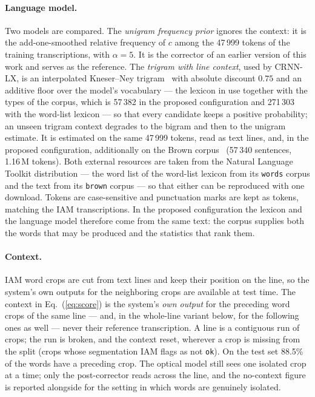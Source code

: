 \documentclass{ws-ijprai}
\newcommand{\ours}{CRNN-LX}            %
\begin{document}
\paragraph{Language model.}
Two models are compared. The \emph{unigram frequency prior} ignores the
context: it is the add-one-smoothed relative frequency of $c$ among the
47\,999 tokens of the training transcriptions, with $\alpha=5$. It is the corrector of an
earlier version of this work and serves as the reference. The
\emph{trigram with line context}, used by \ours, is an interpolated
Kneser--Ney trigram~\cite{chen1999empirical} with absolute discount
$0.75$ and an additive floor over the model's vocabulary --- the lexicon in
use together with the types of the corpus, which is 57\,382 in the proposed
configuration and 271\,303 with the word-list lexicon --- so that every
candidate keeps a positive probability; an unseen trigram context
degrades to the bigram and then to the unigram estimate. It is estimated
on the same 47\,999 tokens, read as text lines, and, in the proposed
configuration, additionally on the Brown corpus~\cite{francis1979brown}
(57\,340 sentences, 1.16\,M tokens). Both external resources are taken from
the Natural Language Toolkit distribution --- the word list of the word-list
lexicon from its \texttt{words} corpus and the text from its \texttt{brown}
corpus --- so that either can be reproduced with one download. Tokens are case-sensitive and
punctuation marks are kept as tokens, matching the IAM transcriptions. In
the proposed configuration the lexicon and the language model therefore come
from the same text: the corpus supplies both the words that may be produced
and the statistics that rank them.

\paragraph{Context.}
IAM word crops are cut from text lines and keep their position on the
line, so the system's own outputs for the neighboring crops are
available at test time. The context in Eq.~(\ref{eq:score}) is the
system's \emph{own output} for the preceding word crops of the same line
--- and, in the whole-line variant below, for the following ones as well ---
never their reference transcription. A line is a contiguous
run of crops; the run is broken, and the context reset, wherever a
crop is missing from the split (crops whose segmentation IAM flags as
not \texttt{ok}). On the test set 88.5\% of the words have a preceding
crop. The optical model still sees one isolated crop at a time; only
the post-corrector reads across the line, and the no-context figure is
reported alongside for the setting in which words are genuinely
isolated.
\end{document}
